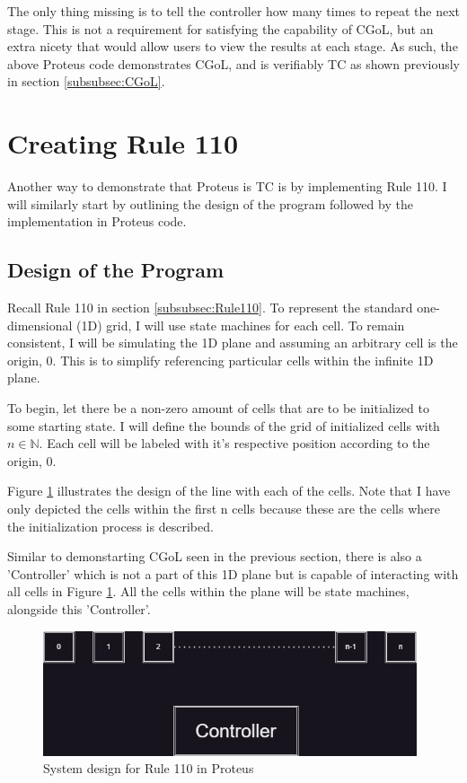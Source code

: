 The only thing missing is to tell the controller how many times to repeat the next stage.
This is not a requirement for satisfying the capability of CGoL, but an extra nicety that would allow users to view the results at each stage.
As such, the above Proteus code demonstrates CGoL, and is verifiably TC as shown previously in section \ref{subsubsec:CGoL}.

\section{Creating Rule 110}\label{sec:ImplementRule110}

Another way to demonstrate that Proteus is TC is by implementing Rule 110.
I will similarly start by outlining the design of the program followed by the implementation in Proteus code.

\subsection{Design of the Program}

Recall Rule 110 in section \ref{subsubsec:Rule110}.
To represent the standard one-dimensional (1D) grid, I will use state machines for each cell.
To remain consistent, I will be simulating the 1D plane and assuming an arbitrary cell is the origin, 0.
This is to simplify referencing particular cells within the infinite 1D plane.

To begin, let there be a non-zero amount of cells that are to be initialized to some starting state.
I will define the bounds of the grid of initialized cells with $n \in \mathbb{N}$.
Each cell will be labeled with it's respective position according to the origin, 0.

Figure \ref{fig:ProteusRule110Design} illustrates the design of the line with each of the cells.
Note that I have only depicted the cells within the first n cells because these are the cells where the initialization process is described.

Similar to demonstarting CGoL seen in the previous section, there is also a 'Controller' which is not a part of this 1D plane but is capable of interacting with all cells in Figure \ref{fig:ProteusRule110Design}.
All the cells within the plane will be state machines, alongside this 'Controller'.

\begin{figure}[htb]
    \centering
    \includegraphics[width=11cm]{Images/Rule110Design.png}
       \caption{System design for Rule 110 in Proteus}
           \label{fig:ProteusRule110Design}
\end{figure}

